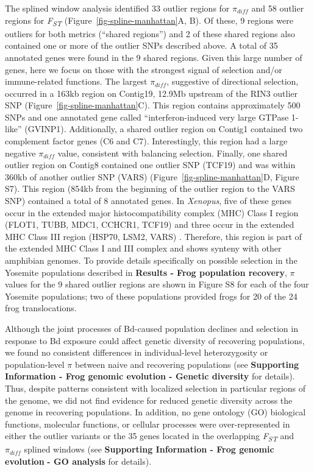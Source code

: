 \documentclass[9pt,twocolumn,twoside,lineno]{pnas-new}
\begin{document}
The splined window analysis identified 33 outlier regions for
\(\pi_{diff}\) and 58 outlier regions for \emph{F\textsubscript{ST}}
(Figure~\ref{fig-spline-manhattan}A, B). Of these, 9 regions were
outliers for both metrics (``shared regions'') and 2 of these shared
regions also contained one or more of the outlier SNPs described above.
A total of 35 annotated genes were found in the 9 shared regions. Given
this large number of genes, here we focus on those with the strongest
signal of selection and/or immune-related functions. The largest
\(\pi_{diff}\), suggestive of directional selection, occurred in a 163kb
region on Contig19, 12.9Mb upstream of the RIN3 outlier SNP
(Figure~\ref{fig-spline-manhattan}C). This region contains
approximately 500 SNPs and one annotated gene called
``interferon-induced very large GTPase 1-like'' (GVINP1). Additionally,
a shared outlier region on Contig1 contained two complement factor genes
(C6 and C7). Interestingly, this region had a large negative
\(\pi_{diff}\) value, consistent with balancing selection. Finally, one
shared outlier region on Contig8 contained one outlier SNP (TCF19) and
was within 360kb of another outlier SNP (VARS)
(Figure~\ref{fig-spline-manhattan}D, Figure S7).
This region (854kb from the beginning of the outlier region to the VARS
SNP) contained a total of 8 annotated genes. In \emph{Xenopus}, five of
these genes occur in the extended major histocompatibility complex (MHC)
Class I region (FLOT1, TUBB, MDC1, CCHCR1, TCF19) and three occur in the
extended MHC Class III region (HSP70, LSM2, VARS) \citep{ohta2006}.
Therefore, this region is part of the extended MHC Class I and III
complex and shows synteny with other amphibian genomes. To provide
details specifically on possible selection in the Yosemite populations
described in \textbf{Results - Frog population recovery}, \(\pi\) values
for the 9 shared outlier regions are shown in
Figure S8 for each of the four Yosemite
populations; two of these populations provided frogs for 20 of the 24
frog translocations.

Although the joint processes of Bd-caused population declines and
selection in response to Bd exposure could affect genetic diversity of
recovering populations, we found no consistent differences in
individual-level heterozygosity or population-level \(\pi\) between
naive and recovering populations (see \textbf{Supporting Information -
Frog genomic evolution - Genetic diversity} for details). Thus, despite
patterns consistent with localized selection in particular regions of
the genome, we did not find evidence for reduced genetic diversity
across the genome in recovering populations. In addition, no gene
ontology (GO) biological functions, molecular functions, or cellular
processes were over-represented in either the outlier variants or the 35
genes located in the overlapping \emph{F\textsubscript{ST}} and
\(\pi_{diff}\) splined windows (see \textbf{Supporting Information -
Frog genomic evolution} \textbf{- GO analysis} for details).
\end{document}
